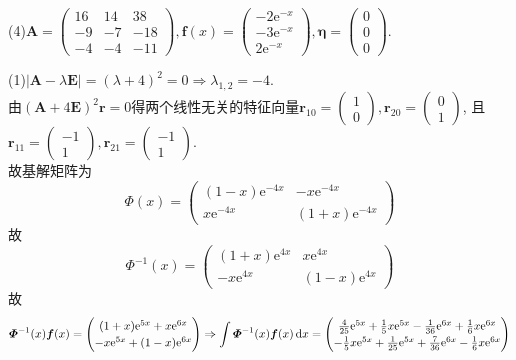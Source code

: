 \documentclass[titlepage,11pt,a4paper,twoside]{report}
\makeatletter
\newcommand\diff{\,\mathrm{d}}
\newcommand\e{\mathrm{e}}
\newcommand\bmitPhi{\bm{\varPhi}}
\newenvironment{solve}{\par
	\pushQED{\qed}%
	\normalfont \topsep1\p@\@plus6\p@\relax
	\trivlist
	\item\relax
	{\hspace*{\parindent}{\heiti 解}\@addpunct{:}}\hspace\labelsep\ignorespaces
}{%
	\popQED\endtrivlist\@endpefalse
}
\makeatother
\begin{document}
(4)$\bm{A}=\begin{pmatrix}16&14&38\\-9&-7&-18\\-4&-4&-11\end{pmatrix},\bm{f}(x)=\begin{pmatrix}-2\e^{-x}\\-3\e^{-x}\\2\e^{-x}\end{pmatrix},\bm{\eta}=\begin{pmatrix}0\\0\\0\end{pmatrix}$.
\begin{solve}
(1)$|\bm{A}-\lambda\bm{E}|=(\lambda+4)^2=0\Rightarrow\lambda_{1,2}=-4$.\\
由$(\bm{A}+4\bm{E})^2\bm{r}=0$得两个线性无关的特征向量$\bm{r}_{10}=\begin{pmatrix}1\\0\end{pmatrix},\bm{r}_{20}=\begin{pmatrix}0\\1\end{pmatrix}$, 且$\bm{r}_{11}=\begin{pmatrix}-1\\1\end{pmatrix},\bm{r}_{21}=\begin{pmatrix}-1\\1\end{pmatrix}$.\\
故基解矩阵为
\[\bmitPhi(x)=\begin{pmatrix}(1-x)\e^{-4x}&-x\e^{-4x}\\x\e^{-4x}&(1+x)\e^{-4x}\end{pmatrix}\]
故
\[\bmitPhi^{-1}(x)=\begin{pmatrix}(1+x)\e^{4x}&x\e^{4x}\\-x\e^{4x}&(1-x)\e^{4x}\end{pmatrix}\]
故
\[\bmitPhi^{-1}(x)\bm{f}(x)=\begin{pmatrix}(1+x)\e^{5x}+x\e^{6x}\\-x\e^{5x}+(1-x)\e^{6x}\end{pmatrix}\Rightarrow\int\bmitPhi^{-1}(x)\bm{f}(x)\diff x=
\renewcommand\arraystretch{1.2}\begin{pmatrix}\frac{4}{25}\e^{5x}+\frac{1}{5}x\e^{5x}-\frac{1}{36}\e^{6x}+\frac{1}{6}x\e^{6x}\\-\frac{1}{5}x\e^{5x}+\frac{1}{25}\e^{5x}+\frac{7}{36}\e^{6x}-\frac{1}{6}x\e^{6x}\end{pmatrix}\]

\end{solve}
\end{document}
